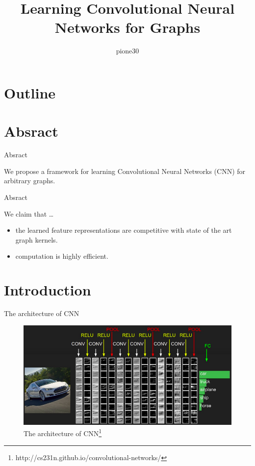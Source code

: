 \documentclass[dvipdfmx]{beamer}
\title{Learning Convolutional Neural Networks for Graphs}
\author{pione30}
\date{}
\begin{document}
  \frame[plain]{\titlepage}


\section*{Outline}

  \begin{frame}
    \tableofcontents
  \end{frame}

\section{Absract}

  \begin{frame}{Absract}

    \alert{We propose a framework for learning Convolutional Neural Networks (CNN) for arbitrary graphs.}
  \end{frame}

  \begin{frame}{Absract}

    \begin{block}{We claim that \dots }
      \begin{itemize}
        \item{the learned feature representations are competitive with state of the art graph kernels.} 
        \item{computation is highly efficient.}
      \end{itemize}
    \end{block}
  \end{frame}

\section{Introduction}

  \begin{frame}{The architecture of CNN}
    \begin{figure}[h]
      \centering
      \includegraphics[width=0.8\paperwidth]{img/CS231n-CNN-architecture.png}
      \caption{The architecture of CNN\footnote{http://cs231n.github.io/convolutional-networks/}}
    \end{figure}
  \end{frame}
\end{document}
